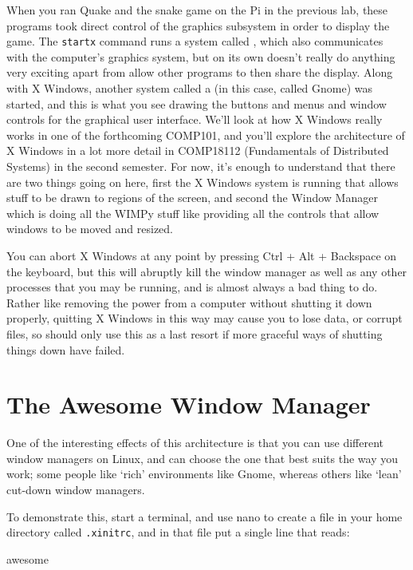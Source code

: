 When you ran Quake and the snake game on the Pi in the previous lab, these programs took direct control of the graphics subsystem in order to display the game. The \texttt{startx} command runs a system called , which also communicates with the computer's graphics system, but on its own doesn't really do anything very exciting apart from allow other programs to then share the display. Along with X Windows, another system called a  (in this case, called Gnome) was started, and this is what you see drawing the buttons and menus and window controls for the graphical user interface. We'll look at how X Windows really works in one of the forthcoming COMP101, and you'll explore the architecture of X Windows in a lot more detail in COMP18112 (Fundamentals of Distributed Systems) in the second semester. For now, it's enough to understand that there are two things going on here, first the X Windows system is running that allows stuff to be drawn to regions of the screen, and second the Window Manager which is doing all the WIMPy stuff like providing all the controls that allow windows to be moved and resized. 

\begin{danger}
You can abort X Windows at any point by pressing Ctrl + Alt + Backspace on the keyboard, but this will abruptly kill the window manager as well as any other processes that you may be running, and is almost always a bad thing to do. Rather like removing the power from a computer without shutting it down properly, quitting X Windows in this way may cause you to lose data, or corrupt files, so should only use this as a last resort if more graceful ways of shutting things down have failed.
\end{danger}


\section{The Awesome Window Manager}
One of the interesting effects of this architecture is that you can use different window managers on Linux, and can choose the one that best suits the way you work; some people like `rich' environments like Gnome, whereas others like `lean' cut-down window managers. 

To demonstrate this, start a terminal, and use nano to create a file in your home directory called \texttt{.xinitrc}, and in that file put a single line that reads:

\begin{ttoutenv}
awesome
\end{ttoutenv}

